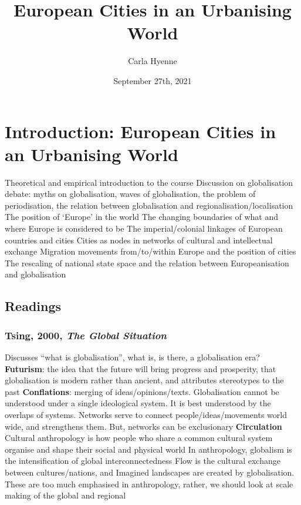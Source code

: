 \documentclass{article}
\title{European Cities in an Urbanising World}
\author{Carla Hyenne }
\begin{document}
\maketitle

\tableofcontents

\pagebreak

\section{Introduction: European Cities in an Urbanising World}
\date{September 27th, 2021}

\begin{outline}
	\1 Theoretical and empirical introduction to the course
	\1 Discussion on globalisation debate: myths on globalisation, waves of globalisation, the problem of periodisation, the relation between globalisation and regionalisation/localisation
	\1 The position of `Europe' in the world
		\2 The changing boundaries of what and where Europe is considered to be
		\2 The imperial/colonial linkages of European countries and cities
		\2 Cities as nodes in networks of cultural and intellectual exchange
		\2 Migration movements from/to/within Europe and the position of cities
		\2 The rescaling of national state space and the relation between Europeanisation and globalisation
\end{outline}

\subsection{Readings}

\subsubsection{Tsing, 2000, \textit{The Global Situation}}

\begin{outline}
	\1 Discusses ``what is globalisation'', what is, is there, a globalisation era?
	\1 \textbf{Futurism}: the idea that the future will bring progress and prosperity, that globalisation is modern rather than ancient, and attributes stereotypes to the past
	\1 \textbf{Conflations}: merging of ideas/opinions/texts. Globalisation cannot be understood under a single ideological system. It is best understood by the overlaps of systems. Networks serve to connect people/ideas/movements world wide, and strengthens them. But, networks can be exclusionary
	\1 \textbf{Circulation}
	\1 Cultural anthropology is how people who share a common cultural system organise and shape their social and physical world
	\1 In anthropology, globalism is the intensification of global interconnectedness
	\1 Flow is the cultural exchange between cultures/nations, and Imagined landscapes are created by globalisation. These are too much emphasised in anthropology, rather, we should look at scale making of the global and regional
\end{outline}
\end{document}
